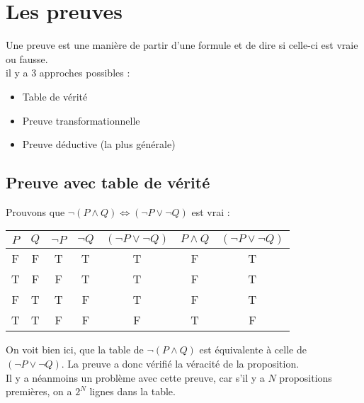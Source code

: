 % 			
% 				
% 	
	\chapter{Les preuves}
		Une preuve est une manière de partir d’une formule et de dire si celle-ci est vraie ou fausse.\\
		il y a 3 approches possibles :
		\begin{itemize}
			\item Table de vérité
			\item Preuve transformationnelle
			\item Preuve déductive (la plus générale)		
		\end{itemize}
		\section{Preuve avec table de vérité}
		Prouvons que $\lnot (P \land Q) \Leftrightarrow (\lnot P \lor \lnot Q)$ est vrai :
			\begin{center}
			\begin{tabular}{cc|ccxcx}
			$P$ & $Q$ & $\lnot P$ & $\lnot Q$ & $(\lnot P \lor \lnot Q)$ & $P \land Q$ & $ (\lnot P \lor \lnot Q)$\\
			\hline
			F&F&T&T&T&F&T\\
			T&F&F&T&T&F&T\\
			F&T&T&F&T&F&T\\
			T&T&F&F&F&T&F\\
			\end{tabular}
			\end{center}
			On voit bien ici, que la table de $\lnot (P \land Q)$ est équivalente à celle de $(\lnot P \lor  \lnot Q)$. La preuve a donc vérifié la véracité de la proposition. \\
			Il y a néanmoins un problème avec cette preuve, car s'il y a $N$ propositions premières, on a $2^N$ lignes dans la table.

